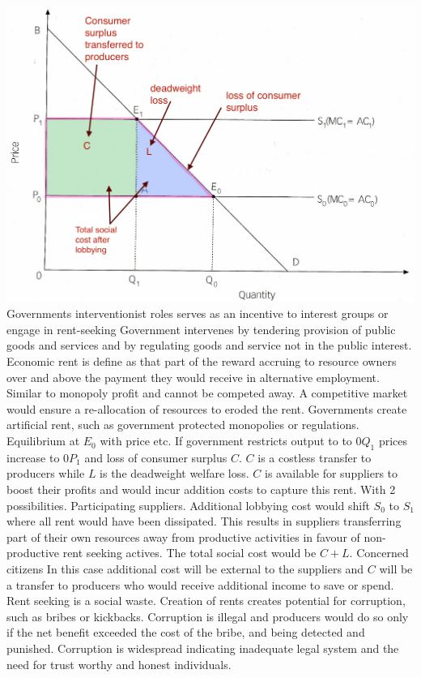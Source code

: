 \documentclass[12pt]{examnotes}
\begin{document}
\includegraphics[scale=0.35]{./imgs/63.jpg}
\ra Governments interventionist roles serves as an incentive to interest groups or engage in rent-seeking
\ra Government intervenes by tendering provision of public goods and services and by regulating goods and service not in the public interest.
\ra Economic rent is define as that part of the reward accruing to resource owners over and above the payment they would receive in alternative employment. Similar to monopoly profit and cannot be competed away.
\ra A competitive market would ensure a re-allocation of resources to eroded the rent.
\ra Governments create artificial rent, such as government protected monopolies or regulations.
\ra Equilibrium at $E_0$ with price etc.
\ra If government restricts output to to $0Q_1$ prices increase to $0P_1$ and loss of consumer surplus $C$.
\ra $C$ is a costless transfer to producers while $L$ is the deadweight welfare loss.
\ra $C$ is available for suppliers to boost their profits and would incur addition costs to capture this rent. With 2 possibilities.
 Participating suppliers. 
\rna Additional lobbying cost would shift $S_0$ to $S_1$ where all rent would have been dissipated.
\rna This results in suppliers transferring part of their own resources away from productive activities in favour of non-productive rent seeking actives.
\rna The total social cost would be $C+L$.
 Concerned citizens
\rna In this case additional cost will be external to the suppliers and $C$ will be a transfer to producers who would receive additional income to save or spend.
\ra Rent seeking is a social waste.
\ra Creation of rents creates potential for corruption, such as bribes or kickbacks. 
\ra Corruption is illegal and producers would do so only if the net benefit exceeded the cost of the bribe, and being detected and punished.
\ra Corruption is widespread indicating inadequate legal system and the need for trust worthy and honest individuals.
\end{document}
